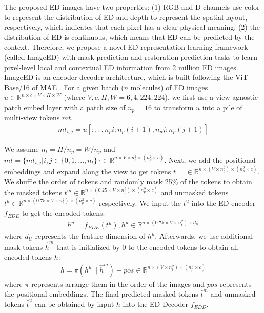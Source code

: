 \documentclass{article}
\begin{document}
The proposed ED images have two properties: (1) RGB and D channels use color to represent the distribution of ED and depth to represent the spatial layout, respectively, which indicates that each pixel has a clear physical meaning; (2) the distribution of ED is continuous, which means that ED can be predicted by the context. Therefore, we propose a novel ED representation learning framework (called ImageED) with mask prediction and restoration prediction tasks to learn pixel-level local and contextual ED information from 2 million ED images. ImageED is an encoder-decoder architecture, which is built following the ViT-Base/16 \cite{dosovitskiy2020image} of MAE \cite{he2022masked}. For a given batch ($n$ molecules) of ED images $u\in\mathbb{R}^{n\times c\times V\times H\times W}$ (where $V, c, H, W=6, 4, 224, 224$), we first use a view-agnostic patch embed layer with a patch size of $n_p=16$ to transform $u$ into a pile of multi-view tokens $mt$. 
\begin{align}
\label{Formula_mt}
mt_{i,j}=u[:, :, n_p i: n_p (i+1), n_p j: n_p (j+1)]
\end{align}

We assume $n_t=H/n_p=W/n_p$ and $mt=\{mt_{i,j}|i, j\in\{0,1,...,n_t\}\}\in\mathbb{R}^{n\times V\times n_t^2\times (n_p^2\times c)}$. Next, we add the positional embeddings and expand along the view to get tokens $t=\in\mathbb{R}^{n\times (V\times n_t^2)\times (n_p^2\times c)}$. We shuffle the order of tokens and randomly mask 25\% of the tokens to obtain the masked tokens $t^m\in\mathbb{R}^{n\times(0.25\times V\times n_t^2)\times (n_p^2\times c)}$ and unmasked tokens $t^u\in\mathbb{R}^{n\times(0.75\times V\times n_t^2)\times (n_p^2\times c)}$ respectively. We input the $t^u$ into the ED encoder $f_{EDE}$ to get the encoded tokens: 
\begin{align}
\label{Formula_h_u}
h^u=f_{EDE}(t^u), h^u\in\mathbb{R}^{n\times(0.75\times V\times n_t^2)\times d_{\mathcal{U}}}
\end{align}
where $d_{\mathcal{U}}$ represents the feature dimension of $h^u$. Afterwards, we use additional mask tokens $\hat{h}^{m}$ that is initialized by 0 to the encoded tokens to obtain all encoded tokens $h$:
\begin{align}
\label{Formula_h}
h=\pi(h^u\parallel\hat{h}^{m})+pos\in\mathbb{R}^{n\times(V\times n_t^2)\times (n_p^2\times c)}
\end{align}
where $\pi$ represents arrange them in the order of the images and $pos$ represents the positional embeddings. The final predicted masked tokens $\hat{t}^m$ and unmasked tokens $\hat{t}^u$ can be obtained by input $h$ into the ED Decoder $f_{EDD}$. 
\end{document}
